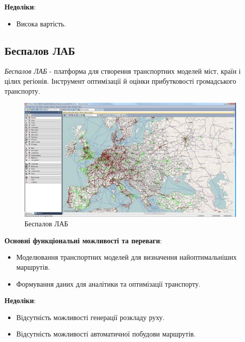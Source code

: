 \documentclass[14pt]{extreport}
\begin{document}
\begin{normalsize}
	\textbf{Недоліки}:
	\begin{itemize}
		\item Висока вартість.
	\end{itemize}
	
	\subsection*{Беспалов ЛАБ}
	\textit{Беспалов ЛАБ} - платформа для створення транспортних моделей міст, країн і цілих регіонів. Інструмент оптимізації й оцінки прибутковості громадського транспорту.
	
	\begin{figure}[H]
		\centering
		\includegraphics[scale=0.45]{2}
		\caption{Беспалов ЛАБ}
	\end{figure}
	
	\textbf{Основні функціональні можливості та переваги}:
	\begin{itemize}
		\item Моделювання транспортних моделей для визначення найоптимальніших маршрутів.
		\item Формування даних для аналітики та оптимізації транспорту.
	\end{itemize}
	
	\textbf{Недоліки}:
	\begin{itemize}
		\item Відсутність можливості генерації розкладу руху.
		\item Відсутність можливості автоматичної побудови маршрутів.
	\end{itemize}
	

\end{normalsize}
\end{document}
